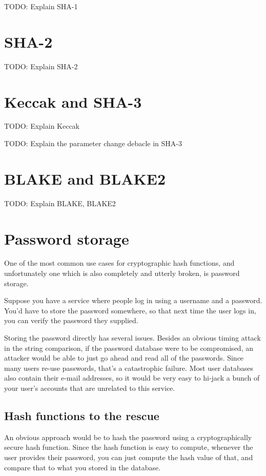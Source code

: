 \documentclass[11pt,ebook,table,dvipsnames]{memoir}
\begin{document}
TODO: Explain SHA-1
\section{SHA-2}
\label{sec-2-6-4}

TODO: Explain SHA-2
\section{Keccak and SHA-3}
\label{sec-2-6-5}

TODO: Explain Keccak

TODO: Explain the parameter change debacle in SHA-3
\section{BLAKE and BLAKE2}
\label{sec-2-6-6}

TODO: Explain BLAKE, BLAKE2
\section{Password storage\label{password-storage}}
\label{sec-2-6-7}

One of the most common use cases for cryptographic hash functions,
and unfortunately one which is also completely and utterly broken, is
password storage.

Suppose you have a service where people log in using a username and a
password. You'd have to store the password somewhere, so that next
time the user logs in, you can verify the password they supplied.

Storing the password directly has several issues. Besides an obvious
timing attack in the string comparison, if the password database were
to be compromised, an attacker would be able to just go ahead and read
all of the passwords. Since many users re-use passwords, that's a
catastrophic failure. Most user databases also contain their e-mail
addresses, so it would be very easy to hi-jack a bunch of your user's
accounts that are unrelated to this service.

\subsection{Hash functions to the rescue}
\label{sec-2-6-7-1}

An obvious approach would be to hash the password using a
cryptographically secure hash function. Since the hash function is
easy to compute, whenever the user provides their password, you can
just compute the hash value of that, and compare that to what you
stored in the database.
\end{document}
